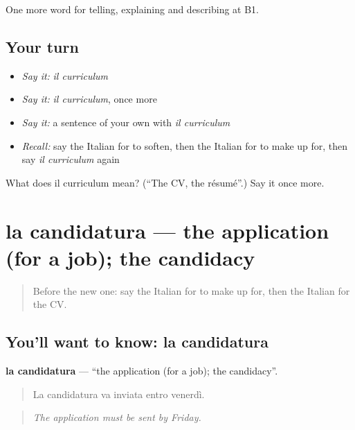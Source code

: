 \begin{grammarlens}[title={What you've built}]
One more word for telling, explaining and describing at B1.
\end{grammarlens}

\subsection*{Your turn}
\begin{itemize}
\raggedright
  \item \emph{Say it:} \emph{il curriculum}
  \item \emph{Say it:} \emph{il curriculum}, once more
  \item \emph{Say it:} a sentence of your own with \emph{il curriculum}
  \item \emph{Recall:} say the Italian for to soften, then the Italian for to make up for, then say \emph{il curriculum} again
\end{itemize}

\begin{tcolorbox}[breakable,colback=teal!4,colframe=teal!35!black,title={Before you move on}]
What does il curriculum mean? (\textquotedblleft{}The CV, the résumé\textquotedblright{}.) Say it once more.
\end{tcolorbox}
\section[la candidatura]{la candidatura — the application (for a job); the candidacy}

\label{lesson:IT-C356-candidatura}



\begin{quote}
Before the new one: say the Italian for to make up for, then the Italian for the CV.
\end{quote}

\subsection*{You'll want to know: la candidatura}
\textbf{la candidatura} — \textquotedblleft{}the application (for a job); the candidacy\textquotedblright{}.

\begin{quote}
La candidatura va inviata entro venerdì.
\end{quote}

\begin{quote}
\emph{The application must be sent by Friday.}
\end{quote}

